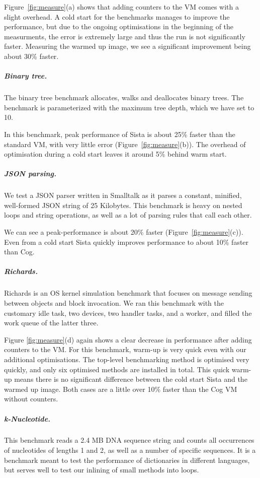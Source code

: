 \documentclass[a4paper,12pt,twoside]{../includes/ThesisStyle}
\begin{document}
Figure~\ref{fig:measure}(a) shows that adding counters to the VM comes with a slight overhead. A cold start for the benchmarks manages to improve the performance, but due to the ongoing optimisations in the beginning of the measurments, the error is extremely large and thus the run is not significantly faster. Measuring the warmed up image, we see a significant improvement being about 30\% faster.                          

\subparagraph{Binary tree.}

The binary tree benchmark allocates, walks and deallocates binary trees. The benchmark is parameterized with  the maximum tree depth, which we have set to 10.

In this benchmark, peak performance of Sista is about 25\% faster than the standard VM, with very little error (Figure~\ref{fig:measure}(b)). The overhead of optimisation during a cold start leaves it around 5\% behind warm start.

\subparagraph{JSON parsing.}

We test a JSON parser written in Smalltalk as it parses a constant, minified, well-formed JSON string of 25 Kilobytes. This benchmark is heavy on nested loops and string operations, as well as a lot of parsing rules that call each other.

We can see a peak-performance is about 20\% faster (Figure~\ref{fig:measure}(c)). Even from a cold start Sista quickly improves performance to about 10\% faster than Cog.

\subparagraph{Richards.}

Richards is an OS kernel simulation benchmark that focuses on message sending between objects and block invocation. We ran this benchmark with the customary idle task, two devices, two handler tasks, and a worker, and filled the work queue of the latter three.

Figure \ref{fig:measure}(d) again shows a clear decrease in performance after adding counters to the VM. For this benchmark, warm-up is very quick even with our additional optimisations. The top-level benchmarking method is optimised very quickly, and only six optimised methods are installed in total. This quick warm-up means there is no significant difference between the cold start Sista and the warmed up image. Both cases are a little over 10\% faster than the Cog VM without counters.

\subparagraph{k-Nucleotide.}

This benchmark reads a 2.4 MB DNA sequence string and counts all occurrences of nucleotides of lengths 1 and 2, as well as a number of specific sequences. It is a benchmark meant to test the performance of dictionaries in different languages, but serves well to test our inlining of small methods into loops.
\end{document}
